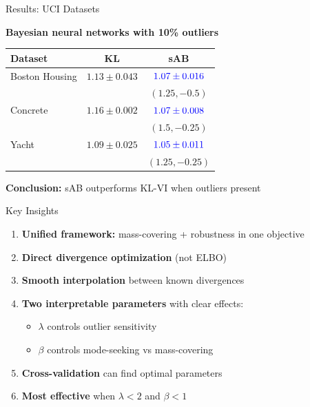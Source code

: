\documentclass{beamer}
\theoremstyle{definition}
\theoremstyle{plain}
\begin{document}
\begin{frame}{Results: UCI Datasets}

\textbf{Bayesian neural networks with 10\% outliers}

\vspace{0.3cm}

\begin{table}[]
\centering
\small
\begin{tabular}{|l|c|c|}
\hline
\textbf{Dataset} & \textbf{KL} & \textbf{sAB} \\
\hline
Boston Housing & $1.13 \pm 0.043$ & $\textcolor{blue}{1.07 \pm 0.016}$ \\
 & & $(1.25, -0.5)$ \\
\hline
Concrete & $1.16 \pm 0.002$ & $\textcolor{blue}{1.07 \pm 0.008}$ \\
 & & $(1.5, -0.25)$ \\
\hline
Yacht & $1.09 \pm 0.025$ & $\textcolor{blue}{1.05 \pm 0.011}$ \\
 & & $(1.25, -0.25)$ \\
\hline
\end{tabular}
\end{table}

\vspace{0.3cm}

\textbf{Conclusion:} sAB outperforms KL-VI when outliers present

\end{frame}
\begin{frame}{Key Insights}

\begin{enumerate}
    \item \textbf{Unified framework:} mass-covering + robustness in one objective
    \item \textbf{Direct divergence optimization} (not ELBO)
    \item \textbf{Smooth interpolation} between known divergences
    \item \textbf{Two interpretable parameters} with clear effects:
    \begin{itemize}
        \item $\lambda$ controls outlier sensitivity
        \item $\beta$ controls mode-seeking vs mass-covering
    \end{itemize}
    \item \textbf{Cross-validation} can find optimal parameters
    \item \textbf{Most effective} when $\lambda < 2$ and $\beta < 1$
\end{enumerate}

\end{frame}
\end{document}

